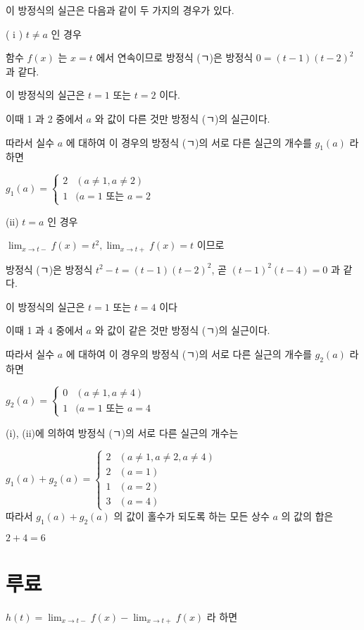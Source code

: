 \documentclass[10pt]{article}
\begin{document}
이 방정식의 실근은 다음과 같이 두 가지의 경우가 있다.

( i ) \(t \neq a\) 인 경우

함수 \(f(x)\) 는 \(x=t\) 에서 연속이므로 방정식 (ㄱ)은 방정식 \(0=(t-1)(t-2)^{2}\) 과 같다.

이 방정식의 실근은 \(t=1\) 또는 \(t=2\) 이다.

이때 1 과 2 중에서 \(a\) 와 값이 다른 것만 방정식 (ㄱ)의 실근이다.

따라서 실수 \(a\) 에 대하여 이 경우의 방정식 (ㄱ)의 서로 다른 실근의 개수를 \(g_{1}(a)\) 라 하면

\(g_{1}(a)= \begin{cases}2 & (a \neq 1, a \neq 2) \\ 1 & (a=1 \text { 또는 } a=2\end{cases}\)

(ii) \(t=a\) 인 경우

\(\lim _{x \rightarrow t-} f(x)=t^{2}, \lim _{x \rightarrow t+} f(x)=t\) 이므로

방정식 (ㄱ)은 방정식 \(t^{2}-t=(t-1)(t-2)^{2}\), 곧 \((t-1)^{2}(t-4)=0\) 과 같다.

이 방정식의 실근은 \(t=1\) 또는 \(t=4\) 이다

이때 1 과 4 중에서 \(a\) 와 값이 같은 것만 방정식 (ㄱ)의 실근이다.

따라서 실수 \(a\) 에 대하여 이 경우의 방정식 (ㄱ)의 서로 다른 실근의 개수를 \(g_{2}(a)\) 라 하면

\(g_{2}(a)= \begin{cases}0 & (a \neq 1, a \neq 4) \\ 1 & (a=1 \text { 또는 } a=4\end{cases}\)

(i), (ii)에 의하여 방정식 (ㄱ)의 서로 다른 실근의 개수는

\(g_{1}(a)+g_{2}(a)= \begin{cases}2 & (a \neq 1, a \neq 2, a \neq 4) \\ 2 & (a=1) \\ 1 & (a=2) \\ 3 & (a=4)\end{cases}\)\\
따라서 \(g_{1}(a)+g_{2}(a)\) 의 값이 홀수가 되도록 하는 모든 상수 \(a\) 의 값의 합은

\(2+4=6\)

\section*{루료}
\(h(t)=\lim _{x \rightarrow t-} f(x)-\lim _{x \rightarrow t+} f(x)\) 라 하면
\end{document}
